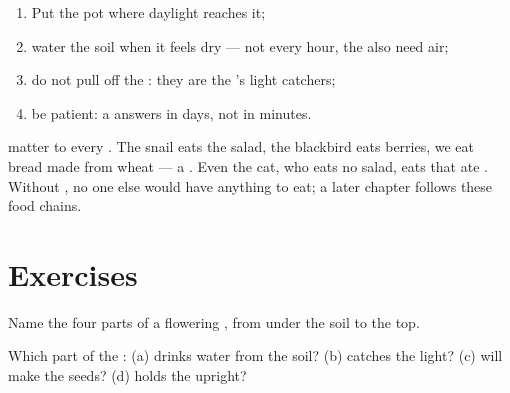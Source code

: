 \begin{method}\label{met:g1:plants-around-us:care}
\begin{enumerate}
  \item Put the pot where daylight reaches it;
  \item water the soil when it feels dry --- not every hour, the
         also need air;
  \item do not pull off the : they are the 's light
        catchers;
  \item be patient: a  answers in days, not in minutes.
\end{enumerate}
\end{method}

\begin{remark}\label{rem:g1:plants-around-us:food}
 matter to every . The snail eats the salad, the
blackbird eats berries, we eat bread made from wheat --- a .
Even the cat, who eats no salad, eats  that ate .
Without , no one else would have anything to eat; a later
chapter follows these food chains.
\end{remark}

\section{Exercises}

\begin{exercise}[$\star$]\label{exo:g1:plants-around-us:1}
Name the four parts of a flowering , from under the soil to
the top.
\end{exercise}

\begin{exercise}[$\star$]\label{exo:g1:plants-around-us:2}
Which part of the : (a) drinks water from the soil? (b)
catches the light? (c) will make the seeds? (d) holds the 
upright?
\end{exercise}

